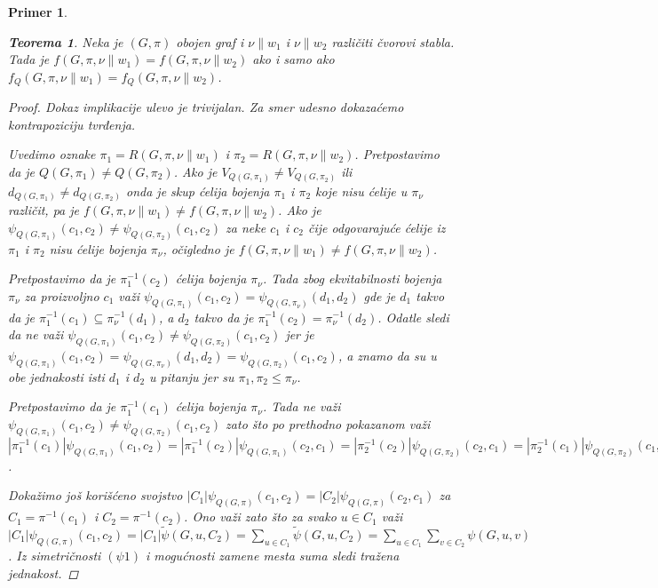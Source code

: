 \documentclass[12pt,oneside]{memoir}
\newtheorem{theorem}{Teorema}
\newtheorem{example}{Primer}
\theoremstyle{definition}
\begin{document}
\begin{example}
  \begin{theorem}
	  Neka je $(G, \pi)$ obojen graf i $\nu \| w_1$ i $\nu \| w_2$ različiti
	  čvorovi stabla. Tada je $f(G, \pi, \nu \| w_1) = f(G, \pi, \nu \| w_2)$
	  ako i samo ako $f_Q(G, \pi, \nu \| w_1) = f_Q(G, \pi, \nu \| w_2)$.
  \end{theorem}
  
  \begin{proof}
	  Dokaz implikacije ulevo je trivijalan. Za smer udesno dokazaćemo
	  kontrapoziciju tvrđenja.

	  Uvedimo oznake $\pi_1 = R(G, \pi, \nu \| w_1)$ i $\pi_2 = R(G, \pi, \nu \|
	  w_2)$. Pretpostavimo da je $Q(G, \pi_1) \neq Q(G, \pi_2)$. Ako je
	  $V_{Q(G, \pi_1)} \neq V_{Q(G, \pi_2)}$ ili $d_{Q(G, \pi_1)} \neq d_{Q(G,
	  \pi_2)}$ onda je skup ćelija bojenja $\pi_1$ i $\pi_2$ koje nisu ćelije u
	  $\pi_\nu$ različit, pa je $f(G, \pi, \nu \| w_1) \neq f(G, \pi, \nu \|
	  w_2)$. Ako je $\psi_{Q(G, \pi_1)}(c_1, c_2) \neq \psi_{Q(G, \pi_2)}(c_1,
	  c_2)$ za neke $c_1$ i $c_2$ čije odgovarajuće ćelije iz $\pi_1$ i $\pi_2$
	  nisu ćelije bojenja $\pi_\nu$, očigledno je $f(G, \pi, \nu \| w_1) \neq
	  f(G, \pi, \nu \| w_2)$.

	  Pretpostavimo da je $\pi_1^{-1}(c_2)$ ćelija bojenja $\pi_\nu$. Tada zbog
	  ekvitabilnosti bojenja $\pi_\nu$ za proizvoljno $c_1$ važi $\psi_{Q(G,
	  \pi_1)}(c_1, c_2) = \psi_{Q(G, \pi_\nu)}(d_1, d_2)$ gde je $d_1$ takvo da
	  je $\pi_1^{-1}(c_1) \subseteq \pi_\nu^{-1}(d_1)$, a $d_2$ takvo da je
	  $\pi_1^{-1}(c_2) = \pi_\nu^{-1}(d_2)$. Odatle sledi da ne važi
	  $\psi_{Q(G, \pi_1)}(c_1, c_2) \neq \psi_{Q(G, \pi_2)}(c_1, c_2)$ jer je
	  $\psi_{Q(G, \pi_1)}(c_1, c_2) = \psi_{Q(G, \pi_\nu)}(d_1, d_2) =
	  \psi_{Q(G, \pi_2)}(c_1, c_2)$, a znamo da su u obe jednakosti isti $d_1$
	  i $d_2$ u pitanju jer su $\pi_1, \pi_2 \leq \pi_\nu$.

	  Pretpostavimo da je $\pi_1^{-1}(c_1)$ ćelija bojenja $\pi_\nu$. Tada ne važi
	  $\psi_{Q(G, \pi_1)}(c_1, c_2) \neq \psi_{Q(G, \pi_2)}(c_1, c_2)$ zato što
	  po prethodno pokazanom važi $|\pi_1^{-1}(c_1)|\psi_{Q(G, \pi_1)}(c_1,
	  c_2) = |\pi_1^{-1}(c_2)|\psi_{Q(G, \pi_1)}(c_2, c_1) =
	  |\pi_2^{-1}(c_2)|\psi_{Q(G, \pi_2)}(c_2, c_1) =
	  |\pi_2^{-1}(c_1)|\psi_{Q(G, \pi_2)}(c_1, c_2)$.

	  Dokažimo još korišćeno svojstvo $|C_1|\psi_{Q(G, \pi)}(c_1, c_2) =
	  |C_2|\psi_{Q(G, \pi)}(c_2, c_1)$ za $C_1 = \pi^{-1}(c_1)$ i $C_2 =
	  \pi^{-1}(c_2)$. Ono važi zato što za svako $u \in C_1$ važi
	  $|C_1|\psi_{Q(G, \pi)}(c_1, c_2) = |C_1|\widetilde{\psi}(G, u, C_2) =
	  \sum_{u \in C_1} \widetilde{\psi}(G, u, C_2) = \sum_{u \in C_1} \sum_{v
	  \in C_2} \psi(G, u, v)$. Iz simetričnosti $(\psi1)$ i mogućnosti zamene
	  mesta suma sledi tražena jednakost.
  \end{proof}


\end{example}
\end{document}
